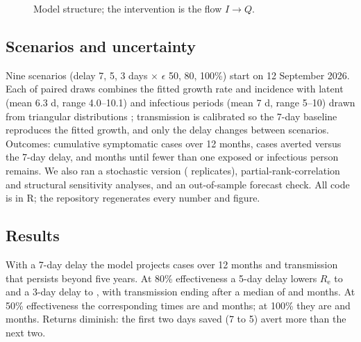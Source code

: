 \documentclass[10pt,a4paper]{article}
\newcommand{\Rt}{R_{\mathrm{e}}}
\begin{document}
\begin{figure}[H]\centering
{}\caption{Model structure; the intervention is the flow $I\to Q$.}\label{fig:model}\end{figure}

\subsection*{Scenarios and uncertainty}
Nine scenarios (delay 7, 5, 3 days $\times$ $\epsilon$ 50, 80, 100\%) start on 12 September 2026. Each of \nDraws{} paired draws combines the fitted growth rate and incidence with latent (mean 6.3 d, range 4.0--10.1) and infectious periods (mean 7 d, range 5--10) drawn from triangular distributions \citep{ebengo2026,chowell2014}; transmission is calibrated so the 7-day baseline reproduces the fitted growth, and only the delay changes between scenarios. Outcomes: cumulative symptomatic cases over 12 months, cases averted versus the 7-day delay, and months until fewer than one exposed or infectious person remains. We also ran a stochastic version (\nStoch{} replicates), partial-rank-correlation and \nVariants{} structural sensitivity analyses, and an out-of-sample forecast check. All code is in R; the repository regenerates every number and figure.

\subsection*{Results}
\begin{table}[H]\centering\scriptsize\caption{Results (median and 95\% uncertainty interval, \nDraws{} paired draws; $^\dagger$ cases averted $\times$ \cfrAssumed, illustrative).}
\resizebox{\textwidth}{!}{}\end{table}
With a 7-day delay the model projects \baseCases{} cases over 12 months and transmission that persists beyond five years. At 80\% effectiveness a 5-day delay lowers $\Rt$ to \ReMedEightyFive{} and a 3-day delay to \ReMedEightyThree, with transmission ending after a median of \durEightyFive{} and \durEightyThree{} months. At 50\% effectiveness the corresponding times are \durFiftyFive{} and \durFiftyThree{} months; at 100\% they are \durHundredFive{} and \durHundredThree{} months. Returns diminish: the first two days saved (7 to 5) avert more than the next two.
\end{document}
